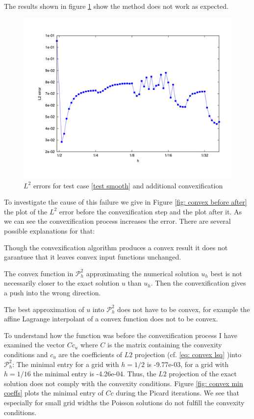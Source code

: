 The results shown in figure \ref{fig: l2 errors test smooth ourMethodConvex} show the method does not work as expected.
\begin{figure}[H]
\centering
	\includegraphics[scale =0.4]{plots/MA1_convexify.pdf}
	\caption{$L^2$ errors for test case \ref{test smooth} and additional convexification}
	\label{fig: l2 errors test smooth ourMethodConvex}
\end{figure}
To investigate the cause of this failure we give in Figure \ref{fig: convex before after} the plot of the $L^2$ error before the convexification step and the plot after it. As we can see the convexification process increases the error. There are several possible explanations for that:

Though the convexification algorithm produces a convex result it does not garantuee that it leaves convex input functions unchanged.

The convex function in $\mathcal P^2_h$ approximating the numerical solution $u_h$ best is not necessarily closer to the exact solution $u$ than $u_h$. Then the convexification gives a push into the wrong direction.

The best approximation of $u$ into $\mathcal P^2_h$ does not have to be convex, for example the affine Lagrange interpolant of a convex function does not to be convex\cite[p.3142]{AM2009}. 

To understand how  the function was before the convexification process I have examined the vector $Cc_u$ where $C$ is the matrix containing the convexity conditions and $c_u$ are the coefficients of $L2$ projection (cf. \eqref{eq: convex lsq} )into $\mathcal P^2_h$: The minimal entry for a grid with $h=1/2$ is -9.77e-03, for a grid with $h=1/16$ the minimal entry is -4.26e-04. Thus, the $L2$ projection of the exact solution does not comply with the convexity conditions.
Figure \ref{fig: convex min coeffs} plots the minimal entry of $Cc$ during the Picard iterations. We see that especially for small grid widths the Poisson solutions do not fulfill the convexity conditions. 

